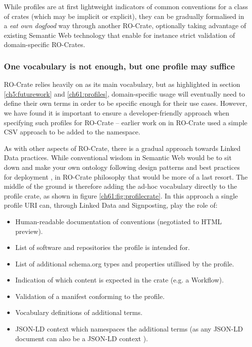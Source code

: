 While profiles are at first lightweight indicators of common conventions for a class of crates (which may be implicit or explicit), they can be gradually formalised in a \emph{eat own dogfood} way through another RO-Crate, optionally taking advantage of existing Semantic Web technology that enable for instance strict validation of domain-specific RO-Crates.


\subsubsection{One vocabulary is not enough, but one profile may suffice}
\label{ch61:oneprofile}

RO-Crate relies heavily on \cite{schema.org} as its main vocabulary, but as highlighted in section \vref{ch5:futurework} and \vref{ch61:profiles}, domain-specific usage will eventually need to define their own terms in order to be specific enough for their use cases. However, we have found it is important to ensure a developer-friendly approach when specifying such profiles for RO-Crate -- earlier work on  in RO-Crate used a simple CSV approach to be added to the  namespace.  

As with other aspects of RO-Crate, there is a gradual approach towards Linked Data practices. While conventional wisdom in Semantic Web would be to sit down and make your own ontology following design patterns \cite{Blomquist 2009,Poveda 2010} and best practices for deployment \cite{Matentzoglu 2022}, in RO-Crate philosophy that would be more of a last resort. The middle of the ground is therefore adding the ad-hoc vocabulary directly to the profile crate, as shown in figure \vref{ch61:fig:profilecrate}. In this approach a single profile URI can, through Linked Data and Signposting, play the role of:

\begin{itemize}
  \item Human-readable documentation of conventions (negotiated to HTML preview).
  \item List of software and repositories the profile is intended for.
  \item List of additional schema.org types and properties utillised by the profile.
  \item Indication of which content is expected in the crate (e.g. a Workflow).
  \item Validation of a manifest conforming to the profile.
  \item Vocabulary definitions of additional terms.
  \item JSON-LD context which namespaces the additional terms  (as any JSON-LD document can also be a JSON-LD context \cite{Sporny 2020}).
\end{itemize}

